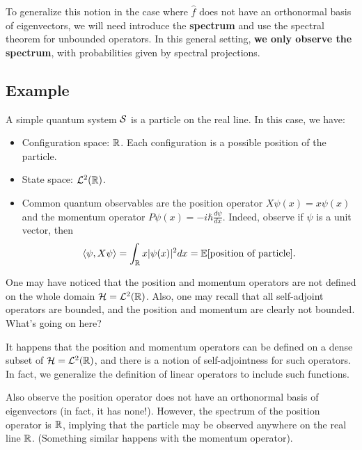To generalize this notion in the case where $\hat{f}$ does not have an orthonormal basis of eigenvectors, we will need introduce the \textbf{spectrum} and use the spectral theorem for unbounded operators. In this general setting, \textbf{we only observe the spectrum}, with probabilities given by spectral projections.

\subsection{Example}
A simple quantum system ${\mathcal S}$ is a particle on the real line. In this case, we have:
\begin{itemize}
    \item Configuration space: ${\mathbb R}$. Each configuration is a possible position of the particle.
    \item State space: ${\mathcal L}^2({\mathbb R})$.
    \item Common quantum observables are the position operator $X\psi(x) = x\psi(x)$ and the momentum operator $P\psi(x) = -i\hbar\frac{d\psi}{dx}$. Indeed, observe if $\psi$ is a unit vector, then
    \[
        \langle \psi, X\psi \rangle = \int_{\mathbb R} x|\psi(x)|^2dx = \mathbb E[\text{position of particle}].
    \]
\end{itemize}
One may have noticed that the position and momentum operators are not defined on the whole domain ${\mathcal H} = {\mathcal L}^2({\mathbb R})$. Also, one may recall that all self-adjoint operators are bounded, and the position and momentum are clearly not bounded. What's going on here?

It happens that the position and momentum operators can be defined on a dense subset of ${\mathcal H} = {\mathcal L}^2({\mathbb R})$, and there is a notion of self-adjointness for such operators. In fact, we generalize the definition of linear operators to include such functions.

Also observe the position operator does not have an orthonormal basis of eigenvectors (in fact, it has none!). However, the spectrum of the position operator is ${\mathbb R}$, implying that the particle may be observed anywhere on the real line ${\mathbb R}$. (Something similar happens with the momentum operator).

